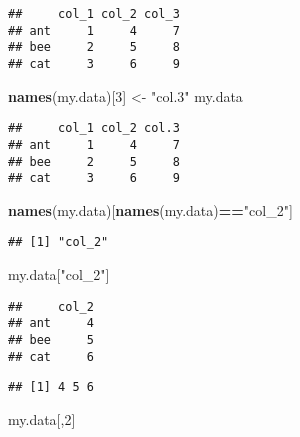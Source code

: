\documentclass[]{book}
\newenvironment{Shaded}{\begin{snugshade}}{\end{snugshade}}
\newcommand{\DecValTok}[1]{\textcolor[rgb]{0.00,0.00,0.81}{#1}}
\newcommand{\KeywordTok}[1]{\textcolor[rgb]{0.13,0.29,0.53}{\textbf{#1}}}
\newcommand{\NormalTok}[1]{#1}
\newcommand{\OperatorTok}[1]{\textcolor[rgb]{0.81,0.36,0.00}{\textbf{#1}}}
\newcommand{\StringTok}[1]{\textcolor[rgb]{0.31,0.60,0.02}{#1}}
\begin{document}
\begin{verbatim}
##     col_1 col_2 col_3
## ant     1     4     7
## bee     2     5     8
## cat     3     6     9
\end{verbatim}

\begin{Shaded}
\begin{Highlighting}[]
\KeywordTok{names}\NormalTok{(my.data)[}\DecValTok{3}\NormalTok{] <-}\StringTok{ "col.3"}
\NormalTok{my.data}
\end{Highlighting}
\end{Shaded}

\begin{verbatim}
##     col_1 col_2 col.3
## ant     1     4     7
## bee     2     5     8
## cat     3     6     9
\end{verbatim}

\begin{Shaded}
\begin{Highlighting}[]
\KeywordTok{names}\NormalTok{(my.data)[}\KeywordTok{names}\NormalTok{(my.data)}\OperatorTok{==}\StringTok{"col_2"}\NormalTok{]}
\end{Highlighting}
\end{Shaded}

\begin{verbatim}
## [1] "col_2"
\end{verbatim}

\begin{Shaded}
\begin{Highlighting}[]
\NormalTok{my.data[}\StringTok{"col_2"}\NormalTok{]}
\end{Highlighting}
\end{Shaded}

\begin{verbatim}
##     col_2
## ant     4
## bee     5
## cat     6
\end{verbatim}

\begin{Shaded}
\end{Shaded}

\begin{verbatim}
## [1] 4 5 6
\end{verbatim}

\begin{Shaded}
\begin{Highlighting}[]
\NormalTok{my.data[,}\DecValTok{2}\NormalTok{]}
\end{Highlighting}
\end{Shaded}
\end{document}
